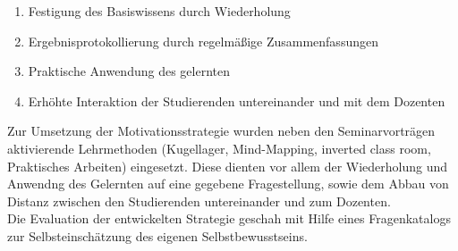 \begin{enumerate}
\item Festigung des Basiswissens durch Wiederholung
\item Ergebnisprotokollierung durch regelmäßige Zusammenfassungen
\item Praktische Anwendung des gelernten
\item Erhöhte Interaktion der Studierenden untereinander und mit dem Dozenten
\end{enumerate}
Zur Umsetzung der Motivationsstrategie wurden neben den Seminarvorträgen aktivierende Lehrmethoden (Kugellager, Mind-Mapping, inverted class room, Praktisches Arbeiten) eingesetzt. Diese dienten vor allem der Wiederholung und Anwendng des Gelernten auf eine gegebene Fragestellung, sowie dem Abbau von Distanz zwischen den Studierenden untereinander und zum Dozenten.\\
\noindent
Die Evaluation der entwickelten Strategie geschah mit Hilfe eines Fragenkatalogs zur Selbsteinschätzung des eigenen Selbstbewusstseins.  

